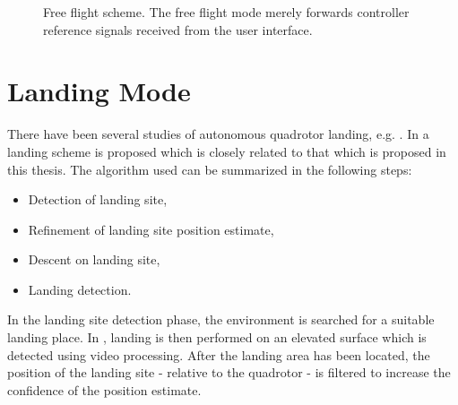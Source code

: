         \begin{figure}[H]
            \noindent{}
            \caption{Free flight scheme. The free flight mode merely forwards controller reference signals received from the user interface.}
            \label{fig:logic:freeflightscheme}
        \end{figure}

    \section{Landing Mode}
        \label{ssec:logic:landing}
        There have been several studies of autonomous quadrotor landing,
        e.g. \citep{mellinger10perching,brockers:803111}.
        In \citep{brockers:803111} a landing scheme is proposed which is
        closely related to that which is proposed in this thesis.
        The algorithm used can be summarized in the following steps:
        \begin{itemize}
            \item Detection of landing site,
            \item Refinement of landing site position estimate,
            \item Descent on landing site,
            \item Landing detection.
        \end{itemize}

        In the landing site detection phase, the environment is searched for a suitable
        landing place. In \citep{brockers:803111}, landing is then performed
        on an elevated surface which is detected using video processing.
        After the landing area has been located, the position of the
        landing site - relative to the quadrotor - is filtered to increase the
        confidence of the position estimate.

